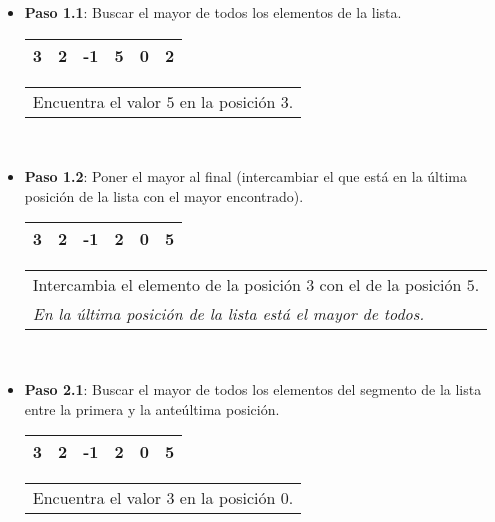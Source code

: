 \begin{itemize}

\item {\bf Paso 1.1}: Buscar el mayor de todos los elementos de la lista.
\\

\hspace{0.75cm}
\begin{tabular}[c]{|c|c|c|c|c|c|}
\hline
3& 2&-1&5&0&2\\
\hline
\end{tabular}
\hspace{0.75cm}
\begin{tabular}{p{9cm}}
Encuentra el valor $5$ en la posición $3$. 
\end{tabular}\\

\item {\bf Paso 1.2}: Poner el mayor al final (intercambiar el que está en la última
posición de la lista con el mayor encontrado).\\

\hspace{0.75cm}
\begin{tabular}[c]{|c|c|c|c|c|c|}
\hline
3& 2&-1&2&0&5\\
\hline
\end{tabular}
\hspace{0.75cm}
\begin{tabular}{p{9cm}}
Intercambia el elemento de la posición $3$ con el de la posición $5$. \\
{\it En la última posición de la lista está el mayor de todos.}
\end{tabular} \\

\item {\bf Paso 2.1}: Buscar el mayor de todos los elementos del segmento de la lista
entre la primera y la anteúltima posición. \\

\hspace{0.75cm}
\begin{tabular}[c]{|c|c|c|c|c|c|}
\hline
3& 2&-1&2&0&5\\
\hline
\end{tabular}
\hspace{0.75cm}
\begin{tabular}{p{9cm}}
Encuentra el valor $3$ en la posición $0$.
\end{tabular} \\


\end{itemize}
